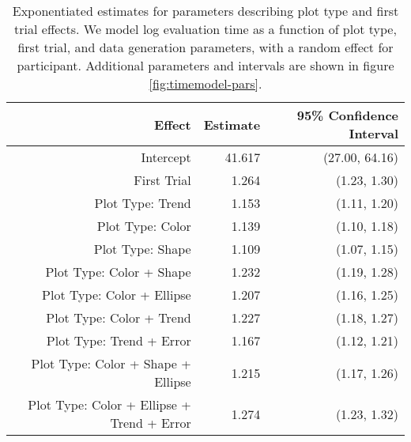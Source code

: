 \begin{table}[ht]
\centering
\begin{tabular}{rrr}
  \hline
Effect & Estimate & 95\% Confidence Interval \\ 
  \hline
Intercept & 41.617 & (27.00, 64.16) \\ 
  First Trial & 1.264 & (1.23, 1.30) \\ 
  Plot Type: Trend & 1.153 & (1.11, 1.20) \\ 
  Plot Type: Color & 1.139 & (1.10, 1.18) \\ 
  Plot Type: Shape & 1.109 & (1.07, 1.15) \\ 
  Plot Type: Color + Shape & 1.232 & (1.19, 1.28) \\ 
  Plot Type: Color + Ellipse & 1.207 & (1.16, 1.25) \\ 
  Plot Type: Color + Trend & 1.227 & (1.18, 1.27) \\ 
  Plot Type: Trend + Error & 1.167 & (1.12, 1.21) \\ 
  Plot Type: Color + Shape + Ellipse & 1.215 & (1.17, 1.26) \\ 
  Plot Type: Color + Ellipse + Trend + Error & 1.274 & (1.23, 1.32) \\ 
   \hline
\end{tabular}
\caption[Fixed effects for trial time model including data parameters.]{Exponentiated estimates for parameters describing plot type and first trial effects. We model log evaluation time as a function of plot type, first trial, and data generation parameters, with a random effect for participant. Additional parameters and intervals are shown in figure \ref{fig:timemodel-pars}.} 
\label{tab:timemodel-pars}
\end{table}
